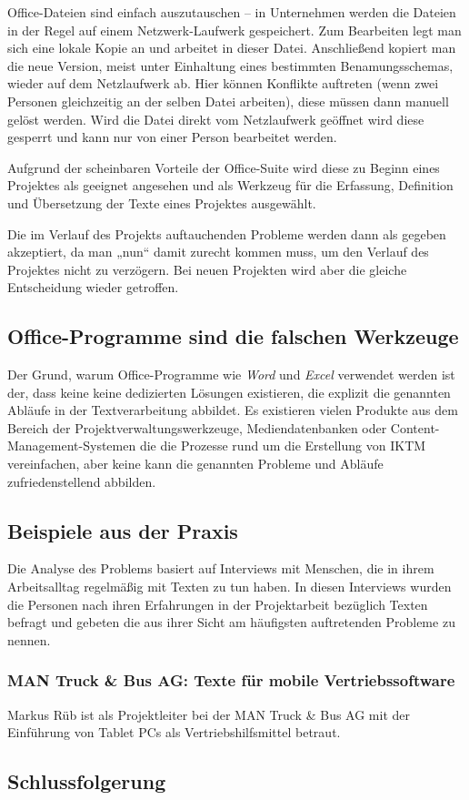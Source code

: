 Office-Dateien sind einfach auszutauschen – in Unternehmen werden die Dateien in der Regel auf einem Netzwerk-Laufwerk gespeichert. Zum Bearbeiten legt man sich eine lokale Kopie an und arbeitet in dieser Datei. Anschließend kopiert man die neue Version, meist unter Einhaltung eines bestimmten Benamungsschemas, wieder auf dem Netzlaufwerk ab. Hier können Konflikte auftreten (wenn zwei Personen gleichzeitig an der selben Datei arbeiten), diese müssen dann manuell gelöst werden. Wird die Datei direkt vom Netzlaufwerk geöffnet wird diese gesperrt und kann nur von einer Person bearbeitet werden.

Aufgrund der scheinbaren Vorteile der Office-Suite wird diese zu Beginn eines Projektes als geeignet angesehen und als Werkzeug für die Erfassung, Definition und Übersetzung der Texte eines Projektes ausgewählt.

Die im Verlauf des Projekts auftauchenden Probleme werden dann als gegeben akzeptiert, da man „nun“ damit zurecht kommen muss, um den Verlauf des Projektes nicht zu verzögern. Bei neuen Projekten wird aber die gleiche Entscheidung wieder getroffen.

\subsection{Office-Programme sind die falschen Werkzeuge}

Der Grund, warum Office-Programme wie \emph{Word} und \emph{Excel} verwendet werden ist der, dass keine keine dedizierten Lösungen existieren, die explizit die genannten Abläufe in der Textverarbeitung abbildet. Es existieren vielen Produkte aus dem Bereich der Projektverwaltungswerkzeuge, Mediendatenbanken oder Content-Management-Systemen die die Prozesse rund um die Erstellung von \ac{IKTM} vereinfachen, aber keine kann die genannten Probleme und Abläufe zufriedenstellend abbilden.

\subsection{Beispiele aus der Praxis}

Die Analyse des Problems basiert auf Interviews mit Menschen, die in ihrem Arbeitsalltag regelmäßig mit Texten zu tun haben. In diesen Interviews wurden die Personen nach ihren Erfahrungen in der Projektarbeit bezüglich Texten befragt und gebeten die aus ihrer Sicht am häufigsten auftretenden Probleme zu nennen.

\subsubsection{MAN Truck \& Bus AG: Texte für mobile Vertriebssoftware}

Markus Rüb ist als Projektleiter bei der MAN Truck \& Bus AG mit der Einführung von Tablet PCs als Vertriebshilfsmittel betraut.

\subsection{Schlussfolgerung}

